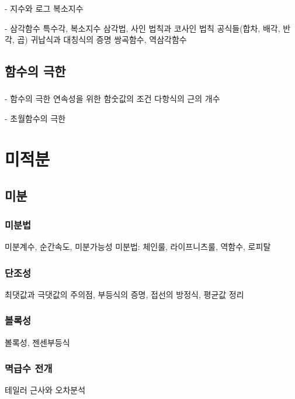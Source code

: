 \documentclass{../../large}
\begin{document}
- 지수와 로그
    복소지수

- 삼각함수
    특수각, 복소지수
    삼각법, 사인 법칙과 코사인 법칙
    공식들(합차, 배각, 반각, 곱)
    귀납식과 대칭식의 증명
    쌍곡함수, 역삼각함수




\chapter{함수의 극한}

\section{}
\section{}
\section{}
\section{}


- 함수의 극한
    연속성을 위한 함숫값의 조건
    다항식의 근의 개수


- 초월함수의 극한




\part{미적분}

\chapter{미분}

\section{미분법}
미분계수, 순간속도, 미분가능성
미분법: 체인룰, 라이프니츠룰, 역함수, 로피탈
\section{단조성}
최댓값과 극댓값의 주의점, 부등식의 증명, 접선의 방정식, 평균값 정리
\section{볼록성}
볼록성, 젠센부등식
\section{멱급수 전개}
테일러 근사와 오차분석
\end{document}
